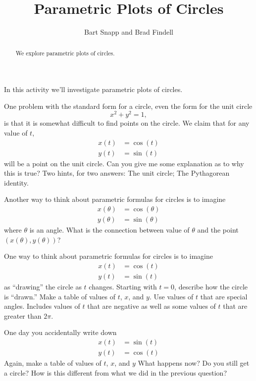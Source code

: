 \documentclass{ximera}
\title{Parametric Plots of Circles}
\author{Bart Snapp and Brad Findell}
\begin{document}
\begin{abstract}
We explore parametric plots of circles. 
\end{abstract}
\maketitle

In this activity we'll investigate parametric plots of circles.


\begin{problem} 
One problem with the standard form for a circle, even the form for the unit circle
\[
x^2 + y^2 = 1,
\]
is that it is somewhat difficult to find points on the circle. We
claim that for any value of $t$,
\begin{align*}
x(t) &= \cos(t)\\
y(t) &= \sin(t) 
\end{align*}
will be a point on the unit circle. Can you give me some explanation
as to why this is true? Two hints, for two answers: The unit circle;
The Pythagorean identity.
\end{problem} 

\begin{problem}
Another way to think about parametric formulas for circles is to imagine 
\begin{align*}
x(\theta) &= \cos(\theta)\\
y(\theta) &= \sin(\theta) 
\end{align*}
where $\theta$ is an angle. What is the connection between value of
$\theta$ and the point $(x(\theta), y(\theta))$?
\end{problem}

\begin{problem}
One way to think about parametric formulas for circles is to imagine 
\begin{align*}
x(t) &= \cos(t)\\
y(t) &= \sin(t) 
\end{align*}
as ``drawing'' the circle as $t$ changes. Starting with $t=0$,
describe how the circle is ``drawn.''  Make a table of values of $t$, $x$, and $y$.  Use values of $t$ that are special angles.  Includes values of $t$ that are negative as well as some values of $t$ that are greater than $2\pi$.  
\end{problem}

\begin{problem}
One day you accidentally write down
\begin{align*}
x(t) &= \sin(t)\\
y(t) &= \cos(t) 
\end{align*}
Again, make a table of values of $t$, $x$, and $y$
What happens now? Do you still get a circle? How is this different
from what we did in the previous question?
\end{problem}
\end{document}
